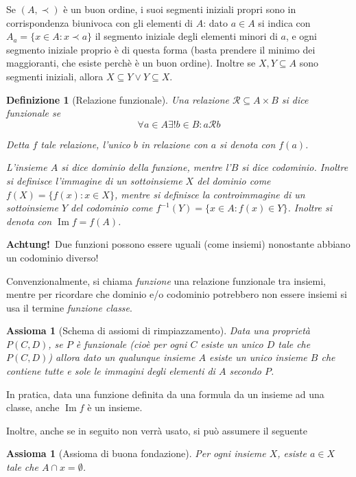 \documentclass[a4paper,10pt,oneside]{article}
\DeclareMathOperator{\im}{Im}
\newcommand{\myname}[1]{\emph{#1}}
\newcommand{\rel}{\mathcal R}
\theoremstyle{plain}
\newtheorem{mydef}[mytheorem]{Definizione}
\newtheorem{myax}[mytheorem]{Assioma}
\theoremstyle{definition}
\theoremstyle{remark}
\begin{document}
Se $(A,\prec)$ è un buon ordine, i suoi segmenti iniziali propri sono in corrispondenza biunivoca con gli elementi di $A$: dato $a\in A$ si indica con $A_{a}=\{x\in A: x\prec a\}$ il segmento iniziale degli elementi minori di $a$, e ogni segmento iniziale proprio è di questa forma (basta prendere il minimo dei maggioranti, che esiste perchè è un buon ordine). Inoltre se $X,Y\subseteq A$ sono segmenti iniziali, allora $X\subseteq Y \vee Y\subseteq X$.

\begin{mydef}[Relazione funzionale]
 Una relazione $\rel \subseteq A\times B$ si dice funzionale se \[\forall a \in A \exists! b \in B: a\rel b\] 
 
 Detta $f$ tale relazione, l'unico $b$ in relazione con $a$ si denota con $f(a)$.
 
 L'insieme $A$ si dice \myname{dominio} della funzione, mentre l'$B$ si dice \myname{codominio}. Inoltre si definisce l'immagine di un sottoinsieme $X$ del dominio come $f(X)=\{f(x):x \in X\}$, mentre si definisce la controimmagine di un sottoinsieme $Y$ del codominio come $f^{-1}(Y)=\{x\in A: f(x)\in Y\}$. Inoltre si denota con $\im f = f(A)$.
\end{mydef}

\textbf{Achtung!}\texttrademark \ Due funzioni possono essere uguali (come insiemi) nonostante abbiano un codominio diverso!\vspace{6px}

Convenzionalmente, si chiama \myname{funzione} una relazione funzionale tra insiemi, mentre per ricordare che dominio e/o codominio potrebbero non essere insiemi si usa il termine \myname{funzione classe}.

\begin{myax}[Schema di assiomi di rimpiazzamento]
Data una proprietà $P(C,D)$, se $P$ è funzionale (cioè per ogni $C$ esiste un unico $D$ tale che $P(C,D)$) allora dato un qualunque insieme $A$ esiste un unico insieme $B$ che contiene tutte e sole le immagini degli elementi di $A$ secondo $P$.
\end{myax}
In pratica, data una funzione definita da una formula da un insieme ad una classe, anche $\im f$ è un insieme.

Inoltre, anche se in seguito non verrà usato, si può assumere il seguente
\begin{myax}[Assioma di buona fondazione]
 Per ogni insieme $X$, esiste $a \in X$ tale che $A \cap x = \emptyset$.
\end{myax}
\end{document}
